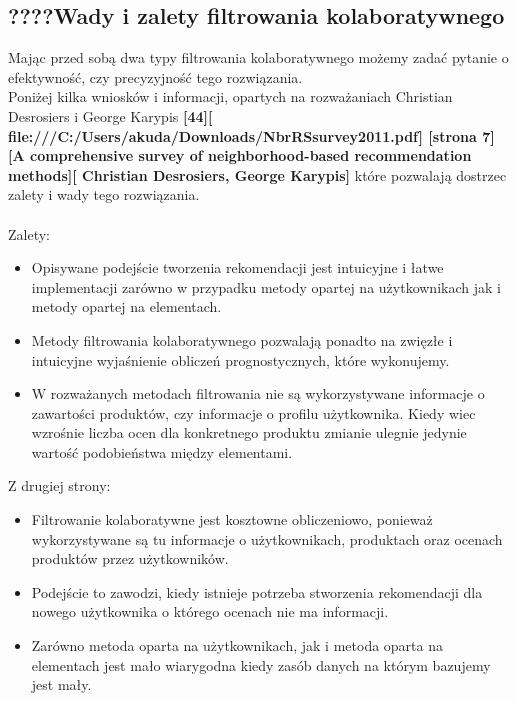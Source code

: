 \documentclass[12pt,a4paper]{report}
\begin{document}
{\subsection{????Wady i zalety filtrowania kolaboratywnego}
Mając przed sobą dwa typy filtrowania kolaboratywnego możemy zadać pytanie o efektywność, czy precyzyjność tego rozwiązania.
\\Poniżej kilka wniosków i informacji, opartych na rozważaniach Christian Desrosiers i George Karypis \textbf{[44][ file:///C:/Users/akuda/Downloads/NbrRSsurvey2011.pdf] [strona 7] [A comprehensive survey of neighborhood-based recommendation methods][ Christian Desrosiers, George Karypis]} które pozwalają dostrzec zalety i wady tego rozwiązania.
\\ 
\\Zalety:
\begin{itemize}
\item Opisywane podejście tworzenia rekomendacji jest intuicyjne i łatwe implementacji zarówno w przypadku metody opartej na użytkownikach jak i metody opartej na elementach. 
\item Metody filtrowania kolaboratywnego pozwalają ponadto na zwięzłe i intuicyjne wyjaśnienie obliczeń prognostycznych, które wykonujemy.
\item W rozważanych metodach filtrowania nie są wykorzystywane informacje o zawartości produktów, czy informacje o profilu użytkownika. Kiedy wiec wzrośnie liczba ocen dla konkretnego produktu zmianie ulegnie jedynie wartość podobieństwa między elementami.
\end{itemize}
Z drugiej strony:
\begin{itemize}
\item Filtrowanie kolaboratywne jest kosztowne obliczeniowo, ponieważ wykorzystywane są tu informacje o użytkownikach, produktach oraz ocenach produktów przez użytkowników. 
\item Podejście to zawodzi, kiedy istnieje potrzeba stworzenia rekomendacji dla nowego użytkownika o którego ocenach nie ma informacji.
\item Zarówno metoda oparta na użytkownikach, jak i metoda oparta na elementach jest mało wiarygodna kiedy zasób danych na którym bazujemy jest mały.
\end{itemize}

}
\end{document}
